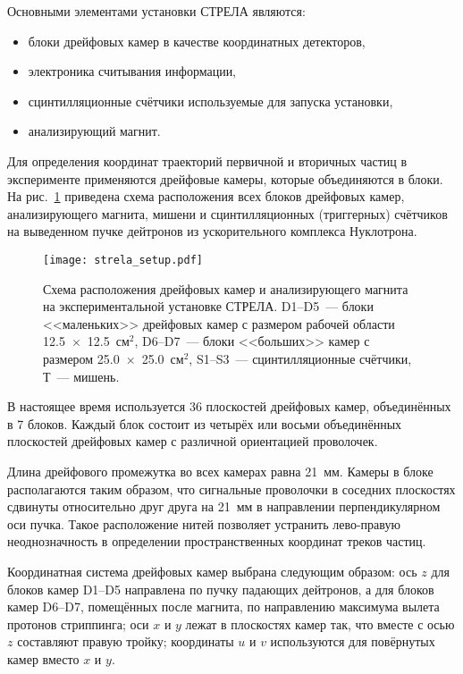 \noindent
Основными элементами установки СТРЕЛА являются:
\begin{itemize}
\item блоки дрейфовых камер в качестве координатных детекторов,
\item электроника считывания информации,
\item сцинтилляционные счётчики используемые для запуска установки,
\item анализирующий магнит.
\end{itemize}

Для определения координат траекторий первичной и вторичных частиц в эксперименте
применяются дрейфовые камеры, которые объединяются в блоки. На
рис.~\ref{fig:strela_setup} приведена схема расположения всех блоков дрейфовых
камер, анализирующего магнита, мишени и сцинтилляционных (триггерных) счётчиков
на выведенном пучке дейтронов из ускорительного комплекса Нуклотрона.

\begin{figure}[h]
  \centering
  \texttt{[image: strela\_setup.pdf]}
  \caption{Схема расположения дрейфовых камер и анализирующего магнита на
    экспериментальной установке СТРЕЛА. D1--D5~--- блоки <<маленьких>> дрейфовых
    камер с размером рабочей области 12.5~$\times$~12.5~см$^2$, D6--D7~---
    блоки <<больших>> камер с размером 25.0~$\times$~25.0~см$^2$, S1--S3~---
    сцинтилляционные счётчики,  Т~--- мишень.}
  \label{fig:strela_setup}
\end{figure}

В настоящее время используется 36 плоскостей дрейфовых камер, объединённых в 7
блоков. Каждый блок состоит из четырёх или восьми объединённых плоскостей
дрейфовых камер с различной ориентацией проволочек.

Длина дрейфового промежутка во всех камерах равна 21~мм.  Камеры в блоке
располагаются таким образом, что сигнальные проволочки в соседних плоскостях
сдвинуты относительно друг друга на 21~мм в направлении перпендикулярном оси
пучка. Такое расположение нитей позволяет устранить лево-правую неоднозначность
в определении пространственных координат треков частиц.

Координатная система дрейфовых камер выбрана следующим образом: ось $z$ для
блоков камер D1--D5 направлена по пучку падающих дейтронов, а для блоков камер
D6--D7, помещённых после магнита, по направлению максимума вылета протонов
стриппинга; оси $x$ и $y$ лежат в плоскостях камер так, что вместе с осью $z$
составляют правую тройку; координаты $u$ и $v$ используются для повёрнутых камер
вместо $x$ и $y$.


